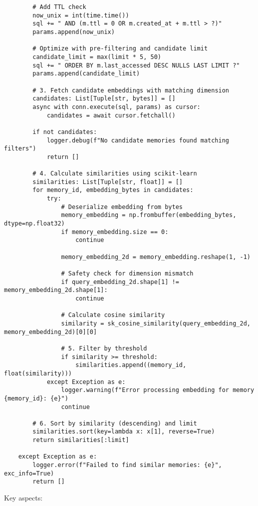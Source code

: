 \documentclass[12pt,a4paper]{article}
\begin{document}
\begin{pageablecode}
\begin{verbatim}
        # Add TTL check
        now_unix = int(time.time())
        sql += " AND (m.ttl = 0 OR m.created_at + m.ttl > ?)"
        params.append(now_unix)

        # Optimize with pre-filtering and candidate limit
        candidate_limit = max(limit * 5, 50)
        sql += " ORDER BY m.last_accessed DESC NULLS LAST LIMIT ?"
        params.append(candidate_limit)

        # 3. Fetch candidate embeddings with matching dimension
        candidates: List[Tuple[str, bytes]] = []
        async with conn.execute(sql, params) as cursor:
            candidates = await cursor.fetchall()

        if not candidates:
            logger.debug(f"No candidate memories found matching filters")
            return []

        # 4. Calculate similarities using scikit-learn
        similarities: List[Tuple[str, float]] = []
        for memory_id, embedding_bytes in candidates:
            try:
                # Deserialize embedding from bytes
                memory_embedding = np.frombuffer(embedding_bytes, dtype=np.float32)
                if memory_embedding.size == 0:
                    continue

                memory_embedding_2d = memory_embedding.reshape(1, -1)

                # Safety check for dimension mismatch
                if query_embedding_2d.shape[1] != memory_embedding_2d.shape[1]:
                    continue

                # Calculate cosine similarity
                similarity = sk_cosine_similarity(query_embedding_2d, memory_embedding_2d)[0][0]

                # 5. Filter by threshold
                if similarity >= threshold:
                    similarities.append((memory_id, float(similarity)))
            except Exception as e:
                logger.warning(f"Error processing embedding for memory {memory_id}: {e}")
                continue

        # 6. Sort by similarity (descending) and limit
        similarities.sort(key=lambda x: x[1], reverse=True)
        return similarities[:limit]

    except Exception as e:
        logger.error(f"Failed to find similar memories: {e}", exc_info=True)
        return []
\end{verbatim}
\end{pageablecode}
Key aspects:
\end{document}
